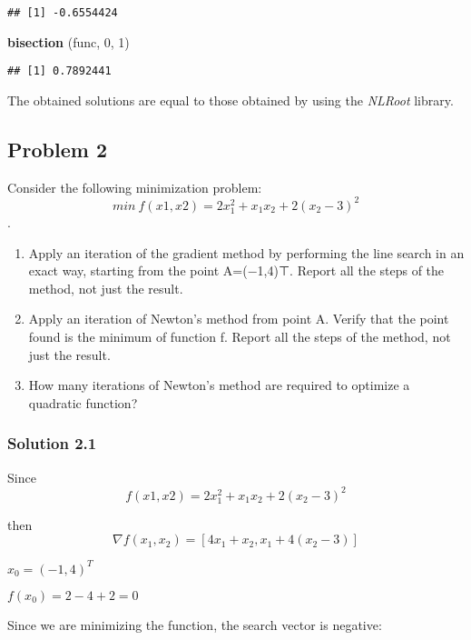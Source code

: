 \documentclass[]{article}
\newenvironment{Shaded}{\begin{snugshade}}{\end{snugshade}}
\newcommand{\DecValTok}[1]{\textcolor[rgb]{0.00,0.00,0.81}{#1}}
\newcommand{\KeywordTok}[1]{\textcolor[rgb]{0.13,0.29,0.53}{\textbf{#1}}}
\newcommand{\NormalTok}[1]{#1}
\begin{document}
\begin{verbatim}
## [1] -0.6554424
\end{verbatim}

\begin{Shaded}
\begin{Highlighting}[]
\KeywordTok{bisection}\NormalTok{ (func, }\DecValTok{0}\NormalTok{, }\DecValTok{1}\NormalTok{)}
\end{Highlighting}
\end{Shaded}

\begin{verbatim}
## [1] 0.7892441
\end{verbatim}

The obtained solutions are equal to those obtained by using the
\emph{NLRoot} library.

\hypertarget{problem-2}{%
\subsection{Problem 2}\label{problem-2}}

Consider the following minimization problem:
\[min \  f(x1,x2)=2x_1^2+x_1x_2+2(x_2−3)^2\].

\begin{enumerate}
\def\labelenumi{\arabic{enumi}.}
\item
  Apply an iteration of the gradient method by performing the line
  search in an exact way, starting from the point A=(−1,4)⊤. Report all
  the steps of the method, not just the result.
\item
  Apply an iteration of Newton's method from point A. Verify that the
  point found is the minimum of function f. Report all the steps of the
  method, not just the result.
\item
  How many iterations of Newton's method are required to optimize a
  quadratic function?
\end{enumerate}

\hypertarget{solution-2.1}{%
\subsubsection{Solution 2.1}\label{solution-2.1}}

Since \[f(x1,x2)=2x_1^2+x_1x_2+2(x_2−3)^2\]

then \[ \nabla f(x_1, x_2) = [4x_1+x_2, x_1+4(x_2-3)]\]

\(x_0 = (-1,4)^T\)

\(f(x_0) = 2-4+2=0\)

Since we are minimizing the function, the search vector is negative:
\end{document}
